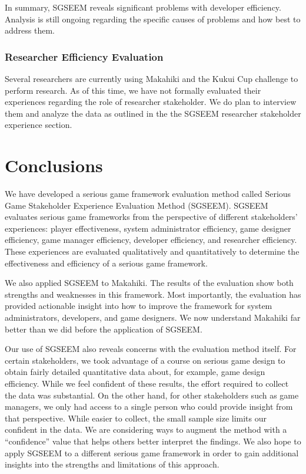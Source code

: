 \documentclass{sigchi}
\begin{document}
In summary, SGSEEM reveals significant problems with developer efficiency.
Analysis is still ongoing regarding the specific causes of problems and how best to
address them.

\subsubsection{Researcher Efficiency Evaluation}

Several researchers are currently using Makahiki and the Kukui Cup challenge to perform
research. As of this time, we have not formally evaluated their experiences regarding the
role of researcher stakeholder. We do plan to interview them and analyze the data as
outlined in the the SGSEEM researcher stakeholder experience section.

\section{Conclusions}

We have developed a serious game framework evaluation method called Serious Game
Stakeholder Experience Evaluation Method (SGSEEM). SGSEEM evaluates serious game
frameworks from the perspective of different stakeholders' experiences: player
effectiveness, system administrator efficiency, game designer efficiency, game manager
efficiency, developer efficiency, and researcher efficiency. These experiences are
evaluated qualitatively and quantitatively to determine the effectiveness and
efficiency of a serious game framework.

We also applied SGSEEM to Makahiki. The results of the evaluation show both strengths and
weaknesses in this framework.  Most importantly, the evaluation has provided actionable
insight into how to improve the framework for system administrators, developers, and game
designers.  We now understand Makahiki far better than we did before the application of
SGSEEM.

Our use of SGSEEM also reveals concerns with the evaluation method itself.  For certain
stakeholders, we took advantage of a course on serious game design to obtain fairly
detailed quantitative data about, for example, game design efficiency.  While we feel
confident of these results, the effort required to collect the data was substantial.  On
the other hand, for other stakeholders such as game managers, we only had access to a
single person who could provide insight from that perspective.  While easier to collect,
the small sample size limits our confident in the data.  We are considering ways to
augment the method with a ``confidence'' value that helps others better interpret the
findings.  We also hope to apply SGSEEM to a different serious game framework in order to
gain additional insights into the strengths and limitations of this approach.
\end{document}
